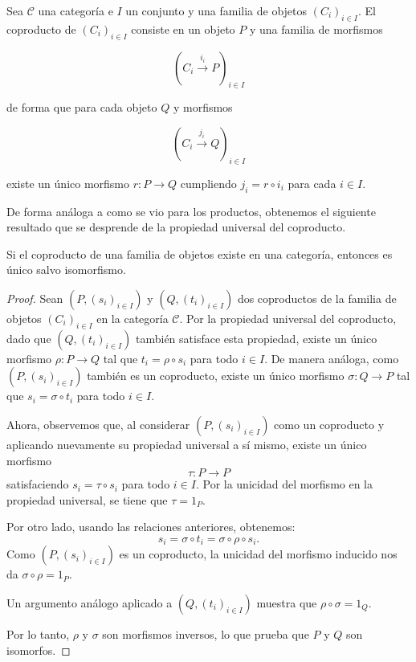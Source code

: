 \begin{definicion}
    Sea \( \mathscr{C} \) una categoría e \( I \) un conjunto y una familia de objetos \( \left(C_i\right)_{i \in I} \). El coproducto de \( \left(C_i\right)_{i \in I} \) consiste en un objeto \( P \) y una familia de morfismos

    \[
        \left(C_i \xrightarrow{i_i} P\right)_{i \in I}
    \]

    de forma que para cada objeto \( Q \) y morfismos

    \[
        \left(C_i \xrightarrow{j_i} Q\right)_{i \in I}
    \]

    existe un único morfismo \( r: P \longrightarrow Q \) cumpliendo \( j_i = r \circ i_i \) para cada \( i \in I \).
\end{definicion}

De forma análoga a como se vio para los productos, obtenemos el siguiente resultado que se desprende de la propiedad universal del coproducto.

\begin{proposicion}
    Si el coproducto de una familia de objetos existe en una categoría, entonces es único salvo isomorfismo.
\end{proposicion}

\begin{proof}
    Sean $\left(P, (s_i)_{i \in I}\right)$ y $(Q, (t_i)_{i \in I})$ dos coproductos de la familia de objetos $\left(C_i\right)_{i \in I}$ en la categoría $\mathscr{C}$.  
    Por la propiedad universal del coproducto, dado que $(Q, (t_i)_{i \in I})$ también satisface esta propiedad, existe un único morfismo  
    $
    \rho: P \longrightarrow Q
    $
    tal que \( t_i = \rho \circ s_i \) para todo \( i \in I \). De manera análoga, como \( (P, (s_i)_{i \in I}) \) también es un coproducto, existe un único morfismo  
    $
    \sigma: Q \longrightarrow P
    $
    tal que \( s_i = \sigma \circ t_i \) para todo \( i \in I \).  

    Ahora, observemos que, al considerar \( (P, (s_i)_{i \in I}) \) como un coproducto y aplicando nuevamente su propiedad universal a sí mismo, existe un único morfismo  
    \[
    \tau: P \longrightarrow P
    \]
    satisfaciendo \( s_i = \tau \circ s_i \) para todo \( i \in I \). Por la unicidad del morfismo en la propiedad universal, se tiene que \( \tau = 1_P \).  

    Por otro lado, usando las relaciones anteriores, obtenemos:
    \[
    s_i = \sigma \circ t_i = \sigma \circ \rho \circ s_i.
    \]
    Como \( (P, (s_i)_{i \in I}) \) es un coproducto, la unicidad del morfismo inducido nos da \( \sigma \circ \rho = 1_P \).  

    Un argumento análogo aplicado a \( (Q, (t_i)_{i \in I}) \) muestra que \( \rho \circ \sigma = 1_Q \).  

    Por lo tanto, \( \rho \) y \( \sigma \) son morfismos inversos, lo que prueba que \( P \) y \( Q \) son isomorfos.
\end{proof}
    

